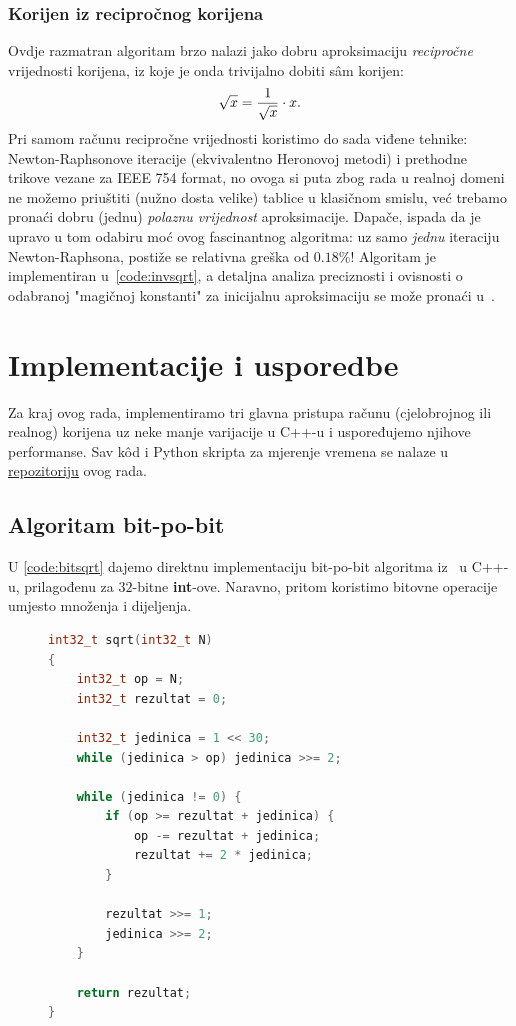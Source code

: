 \documentclass[12pt]{scrartcl}
\begin{document}
\subsubsection{Korijen iz recipročnog korijena}
Ovdje razmatran
algoritam brzo nalazi jako dobru aproksimaciju \emph{recipročne} vrijednosti korijena, iz koje je onda trivijalno dobiti s\^am korijen:
\begin{equation}
    \sqrt{x} = \frac{1}{\sqrt{x}} \cdot x\text.
\end{equation}
Pri samom računu recipročne vrijednosti koristimo do sada viđene tehnike: Newton-Raphsonove iteracije (ekvivalentno Heronovoj metodi) i prethodne
trikove vezane za IEEE 754 format, no ovoga si puta zbog rada u realnoj domeni ne možemo priuštiti (nužno dosta velike) tablice u klasičnom smislu,
već trebamo pronaći dobru (jednu)
\emph{polaznu vrijednost} aproksimacije. Dapače, ispada da je upravo u tom odabiru moć ovog fascinantnog algoritma: uz samo \emph{jednu} iteraciju
Newton-Raphsona, postiže se relativna greška od $0.18\%$! Algoritam je implementiran u~\autoref{code:invsqrt}, a detaljna analiza preciznosti i ovisnosti
o odabranoj "magičnoj konstanti" za inicijalnu aproksimaciju se može pronaći u~\cite{lomont}.

\section{Implementacije i usporedbe}
Za kraj ovog rada, implementiramo tri glavna pristupa računu (cjelobrojnog ili realnog) korijena uz neke manje varijacije
u C++-u i uspoređujemo njihove performanse. Sav k\^od i Python skripta za mjerenje vremena se nalaze u
\href{https://github.com/mraguzin/mathsoft-esej2}{repozitoriju} ovog rada.

\subsection{Algoritam bit-po-bit}
U \autoref{code:bitsqrt} dajemo direktnu implementaciju bit-po-bit algoritma iz~\cite{guysqrt} u C++-u, pri\-la\-gođe\-nu za $32$-bitne \textbf{int}-ove.
Naravno, pritom koristimo bitovne operacije umjesto množenja i dijeljenja.
\begin{figure}[h]
\begin{lstlisting}[language=C++, label=code:bitsqrt, caption=Bit-po-bit algoritam u C++-u]
int32_t sqrt(int32_t N)
{
	int32_t op = N;
	int32_t rezultat = 0;

	int32_t jedinica = 1 << 30;
	while (jedinica > op) jedinica >>= 2;

	while (jedinica != 0) {
		if (op >= rezultat + jedinica) {
			op -= rezultat + jedinica;
			rezultat += 2 * jedinica;
		}

		rezultat >>= 1;
		jedinica >>= 2;
	}

	return rezultat;
}
\end{lstlisting}
\end{figure}
\end{document}
